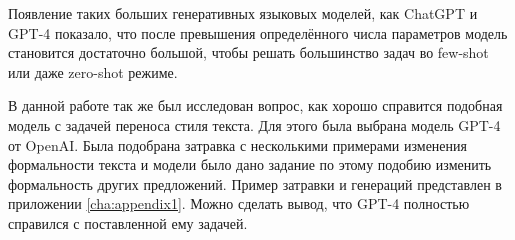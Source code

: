 Появление таких больших генеративных языковых моделей, как ChatGPT и GPT-4 \cite{gpt3, openai2023gpt4} показало, что после превышения определённого числа параметров модель становится достаточно большой, чтобы решать большинство задач во few-shot или даже zero-shot режиме.

В данной работе так же был исследован вопрос, как хорошо справится подобная модель с задачей переноса стиля текста.
Для этого была выбрана модель GPT-4 от OpenAI.
Была подобрана затравка с несколькими примерами изменения формальности текста и модели было дано задание по этому подобию изменить формальность других предложений.
Пример затравки и генераций представлен в приложении \ref{cha:appendix1}.
Можно сделать вывод, что GPT-4 полностью справился с поставленной ему задачей.
